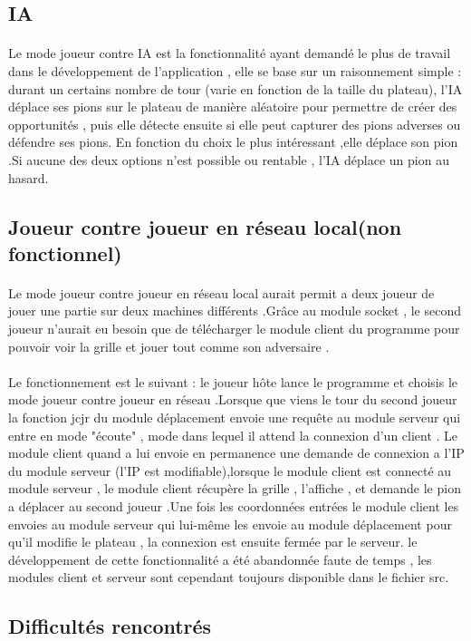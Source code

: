 \documentclass[a4paper,12pt]{article}
\begin{document}
\subsection{IA}
\paragraph{}
Le mode joueur contre IA est la fonctionnalité ayant demandé le plus de travail dans le développement de l'application , elle se base sur un raisonnement simple : durant un certains nombre de tour (varie en fonction de la taille du plateau), l'IA déplace ses pions sur le plateau de manière aléatoire pour permettre de créer des opportunités , puis elle détecte ensuite si elle peut capturer des pions adverses ou défendre ses pions. En fonction du choix le plus intéressant ,elle déplace son pion .Si aucune des deux options n'est possible ou rentable , l'IA déplace un pion au hasard.

\subsection{Joueur contre joueur en réseau local(non fonctionnel)}
\paragraph{}
Le mode joueur contre joueur en réseau local aurait permit a deux joueur de jouer une partie sur deux machines différents .Grâce au module socket , le second joueur n'aurait eu besoin que de télécharger le module client du programme pour pouvoir voir la grille et jouer tout comme son adversaire .
\paragraph{}
Le fonctionnement est le suivant : le joueur hôte lance le programme et choisis le mode joueur contre joueur en réseau .Lorsque que viens le tour du second joueur la fonction jcjr du module déplacement envoie une requête au module serveur qui entre en mode "écoute" , mode dans lequel il attend la connexion d'un client .
\newline
Le module client quand a lui envoie en permanence une demande de connexion a l'IP du module serveur (l'IP est modifiable),lorsque le module client est connecté au module serveur , le module client récupère la grille , l'affiche , et demande le pion a déplacer au second joueur .Une fois les coordonnées entrées le module client les envoies au module serveur qui lui-même les envoie au module déplacement pour qu'il modifie le plateau , la connexion est ensuite fermée par le serveur.
\newline le développement de cette fonctionnalité a été abandonnée faute de temps , les modules client et serveur sont cependant toujours disponible dans le fichier src.
\newpage
\begin{center}
\section{Difficultés rencontrés}
\end{center}
\end{document}
